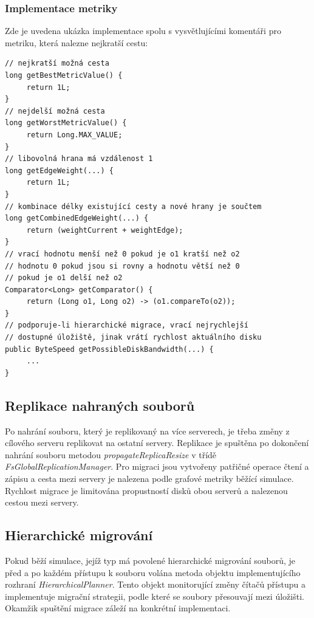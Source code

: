 \documentclass[czech,DP]{thesiskiv}
\begin{document}
\subsubsection*{Implementace metriky}

Zde je uvedena ukázka implementace spolu s vysvětlujícími komentáři pro metriku, která nalezne nejkratší cestu:

\begin{verbatim}
// nejkratší možná cesta
long getBestMetricValue() {
     return 1L;
}
// nejdelší možná cesta
long getWorstMetricValue() {
     return Long.MAX_VALUE;
}
// libovolná hrana má vzdálenost 1
long getEdgeWeight(...) {
     return 1L;
}
// kombinace délky existující cesty a nové hrany je součtem
long getCombinedEdgeWeight(...) {
     return (weightCurrent + weightEdge);
}
// vrací hodnotu menší než 0 pokud je o1 kratší než o2
// hodnotu 0 pokud jsou si rovny a hodnotu větší než 0
// pokud je o1 delší než o2
Comparator<Long> getComparator() {
     return (Long o1, Long o2) -> (o1.compareTo(o2));
}
// podporuje-li hierarchické migrace, vrací nejrychlejší 
// dostupné úložiště, jinak vrátí rychlost aktuálního disku
public ByteSpeed getPossibleDiskBandwidth(...) {
     ...
}

\end{verbatim}

\subsection{Replikace nahraných souborů}

Po nahrání souboru, který je replikovaný na více serverech, je třeba změny z cílového serveru replikovat na ostatní servery. Replikace je spuštěna po dokončení nahrání souboru metodou \textit{propagateReplicaResize} v třídě \textit{FsGlobalReplicationManager}. Pro migraci jsou vytvořeny patřičné operace čtení a zápisu a cesta mezi servery je nalezena podle grafové metriky běžící simulace. Rychlost migrace je limitována propustností disků obou serverů a nalezenou cestou mezi servery. 

\subsection{Hierarchické migrování}

Pokud běží simulace, jejíž typ má povolené hierarchické migrování souborů, je před a po každém přístupu k souboru volána metoda objektu implementujícího rozhraní \textit{HierarchicalPlanner}. Tento objekt monitorující změny čítačů přístupu a  implementuje migrační strategii, podle které se soubory přesouvají mezi úložišti. Okamžik spuštění migrace záleží na konkrétní implementaci. 
\end{document}
